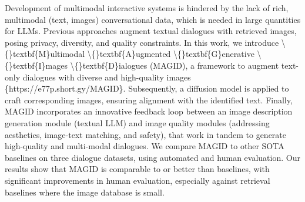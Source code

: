 Development of multimodal interactive systems is hindered by the lack of rich, multimodal (text, images) conversational data, which is needed in large quantities for LLMs. Previous approaches augment textual dialogues with retrieved images, posing privacy, diversity, and quality constraints. In this work, we introduce \textbackslash\{\}textbf\{M\}ultimodal \textbackslash\{\}textbf\{A\}ugmented \textbackslash\{\}textbf\{G\}enerative \textbackslash\{\}textbf\{I\}mages \textbackslash\{\}textbf\{D\}ialogues (MAGID), a framework to augment text-only dialogues with diverse and high-quality images \{https://e77p.short.gy/MAGID\}. Subsequently, a diffusion model is applied to craft corresponding images, ensuring alignment with the identified text. Finally, MAGID incorporates an innovative feedback loop between an image description generation module (textual LLM) and image quality modules (addressing aesthetics, image-text matching, and safety), that work in tandem to generate high-quality and multi-modal dialogues. We compare MAGID to other SOTA baselines on three dialogue datasets, using automated and human evaluation. Our results show that MAGID is comparable to or better than baselines, with significant improvements in human evaluation, especially against retrieval baselines where the image database is small.